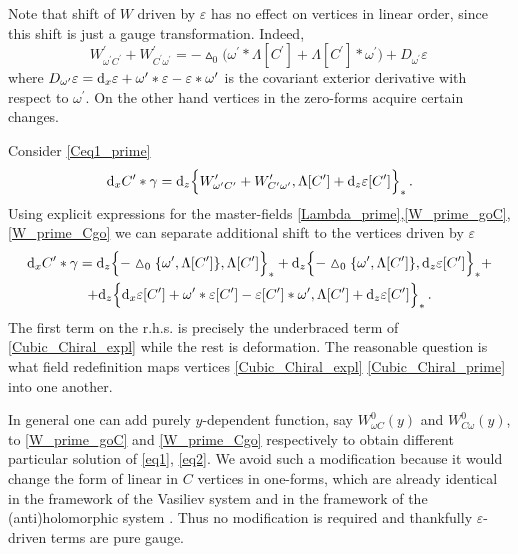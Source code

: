 \documentclass[12pt]{article}
\newcommand{\dr}{{{\rm d}}}
\newcommand{\go}{\omega}
\newcommand{\hmt}{\vartriangle}
\begin{document}
Note that shift of $W$ driven by $\varepsilon$ has no effect on vertices in linear order, since this shift is just a gauge transformation. Indeed,
\begin{equation}\label{gauge_varepsilon}
W^\prime_{\go^\prime C^\prime }+W^\prime_{C^\prime\go^\prime}=-\hmt_0\big(\go^\prime \ast \Lambda[C^\prime]+\Lambda[C^\prime]\ast \go^\prime\big)+D_{\go^\prime}\varepsilon\,
\end{equation}
where $D_{\go^\prime}\varepsilon=\dr_x \varepsilon+\go^\prime\ast \varepsilon-\varepsilon\ast \go^\prime$ is the covariant exterior derivative with respect to $\go^\prime$. On the other hand vertices in the zero-forms acquire certain changes.

Consider \eqref{Ceq1_prime} 
\begin{equation}
\dr_x C^\prime\ast \gamma=\dr_z\Big\{W^\prime_{\go^\prime C^\prime }+W^\prime_{C^\prime \go^\prime},\Lambda[C^\prime]+\dr_z \varepsilon[C^\prime]\Big\}_\ast\,.
\end{equation}
Using explicit expressions for the master-fields   \eqref{Lambda_prime},\eqref{W_prime_goC}, \eqref{W_prime_Cgo} we can separate additional shift to the vertices driven by $\varepsilon$
\begin{multline}\label{Cubic_Chiral_prime}
\dr_x C^\prime\ast \gamma=\dr_z\Big\{-\hmt_0\{\go^\prime,\Lambda[C^\prime]\},\Lambda[C^\prime]\Big\}_\ast+\dr_z\Big\{-\hmt_0\{\go^\prime,\Lambda[C^\prime]\},\dr_z \varepsilon[C^\prime]\Big\}_\ast+\\+\dr_z\Big\{\dr_x \varepsilon[C^\prime]+\go^\prime\ast \varepsilon[C^\prime]-\varepsilon[C^\prime]\ast \go^\prime,\Lambda[C^\prime]+\dr_z \varepsilon[C^\prime]\Big\}_\ast\,.
\end{multline}
The first term on the r.h.s. is precisely the underbraced term of \eqref{Cubic_Chiral_expl} while the rest is deformation. The reasonable question is what field redefinition maps vertices \eqref{Cubic_Chiral_expl} \eqref{Cubic_Chiral_prime} into one another.

In general one can add purely $y$-dependent function, say $W^0_{\go C}(y)$ and $W^0_{C\go}(y)$, to \eqref{W_prime_goC} and \eqref{W_prime_Cgo} respectively to obtain different particular solution of \eqref{eq1}, \eqref{eq2}. We avoid such a modification because it would change the form of linear in $C$ vertices in one-forms, which are already identical in the framework of the Vasiliev system \cite{Didenko:2015cwv} and in the framework of the (anti)holomorphic system \cite{Didenko:2024zpd}. Thus no modification is required and thankfully $\varepsilon$-driven terms are pure gauge.
\end{document}
